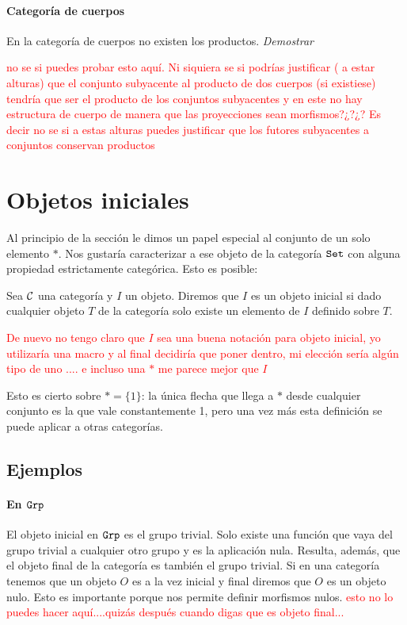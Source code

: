 \paragraph{Categoría de cuerpos}
En la categoría de cuerpos no existen los productos.
\textit{Demostrar}

\textcolor{red}{no se si puedes probar esto aquí. Ni siquiera se si podrías justificar ( a estar alturas) que el conjunto subyacente al producto de dos cuerpos (si existiese) tendría que ser el producto de los conjuntos subyacentes y en este no hay estructura de cuerpo de manera que las proyecciones sean morfismos?¿?¿?  Es decir no se si a estas alturas puedes justificar que los futores subyacentes a conjuntos conservan productos}


\section{Objetos iniciales}
Al principio de la sección le dimos un papel especial al conjunto
de un solo elemento $*$. Nos gustaría caracterizar a ese objeto de
la categoría $\texttt{Set}$ con alguna propiedad estrictamente categórica.
Esto es posible:

\begin{definition}
Sea $\mathcal{C}$ una categoría y $I$ un objeto. Diremos que $I$ es un objeto
inicial si dado cualquier objeto $T$ de la categoría solo existe un
elemento de $I$ definido sobre $T$. 
\end{definition}

\textcolor{red}{De nuevo no tengo claro que $I$ sea una buena notación para objeto inicial, yo utilizaría una macro y al final decidiría que poner dentro, mi elección sería algún tipo de uno .... e incluso una $*$ me parece mejor que $I$ }

Esto es cierto sobre $* = \{ 1 \}$: la única flecha que llega 
a $*$ desde cualquier conjunto es la que vale constantemente 1, pero
una vez más esta definición se puede aplicar a otras categorías.

\subsection{Ejemplos}
\paragraph{En $\texttt{Grp}$}
El objeto inicial en $\texttt{Grp}$ es el grupo trivial. Solo existe una función
que vaya del grupo trivial a cualquier otro grupo y es la aplicación
nula. Resulta, además, que el objeto final de la categoría es también
el grupo trivial. Si en una categoría tenemos que un objeto
$O$ es a la vez inicial y final diremos que $O$ es un objeto nulo. Esto
es importante porque nos permite definir morfismos nulos. \textcolor{red}{esto no lo puedes hacer aquí....quizás después cuando digas que es objeto final...}


